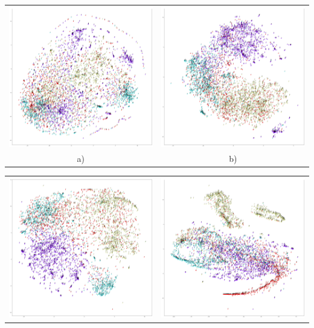 \documentclass{article}
\begin{document}
\begin{center}
  \begin{tabular}{cc}
  \includegraphics[width=0.49\linewidth]{figures/videos_1024_tsne_random_5000.png} &
  \includegraphics[width=0.49\linewidth]{figures/videos_128_tsne_random_5000.png} \\
   a) & b)\\
   \end{tabular}
   \begin{tabular}{cc}
  \includegraphics[width=0.49\linewidth]{figures/concat_128_tsne_random_5000.png} & \includegraphics[width=0.49\linewidth]{figures/concat_alternating_128.png} \\

\end{tabular}
\end{center}
\end{document}
